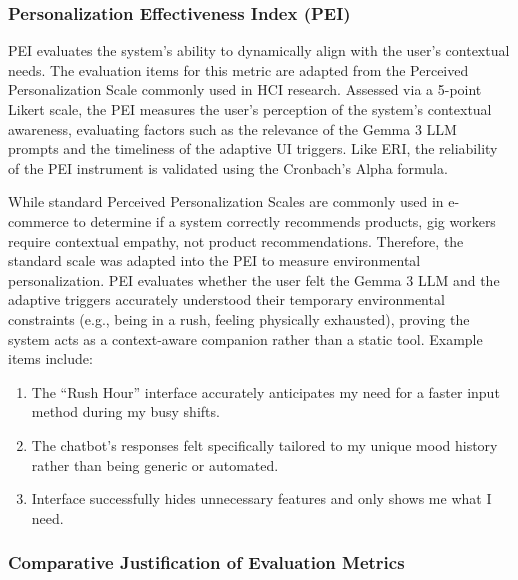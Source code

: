 \subsubsection{Personalization Effectiveness Index (PEI)}

PEI evaluates the system's ability to dynamically align with the user's contextual needs. The evaluation items for this metric are adapted from the Perceived Personalization Scale commonly used in HCI research. Assessed via a 5-point Likert scale, the PEI measures the user's perception of the system's contextual awareness, evaluating factors such as the relevance of the Gemma 3 LLM prompts and the timeliness of the adaptive UI triggers. Like ERI, the reliability of the PEI instrument is validated using the Cronbach's Alpha formula.

While standard Perceived Personalization Scales are commonly used in e-commerce to determine if a system correctly recommends products, gig workers require contextual empathy, not product recommendations. Therefore, the standard scale was adapted into the PEI to measure environmental personalization. PEI evaluates whether the user felt the Gemma 3 LLM and the adaptive triggers accurately understood their temporary environmental constraints (e.g., being in a rush, feeling physically exhausted), proving the system acts as a context-aware companion rather than a static tool. Example items include:

\begin{enumerate}
	\item The ``Rush Hour'' interface accurately anticipates my need for a faster input method during my busy shifts.
	\item The chatbot's responses felt specifically tailored to my unique mood history rather than being generic or automated.
	\item Interface successfully hides unnecessary features and only shows me what I need.
\end{enumerate}

\subsubsection{Comparative Justification of Evaluation Metrics}

